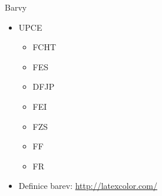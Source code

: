 \documentclass{beamer}							%
\begin{document}
\begin{frame}[fragile, shrink=0]{Barvy}
	\begin{itemize}
		\item \textcolor{upce}{UPCE}
		\begin{itemize}
			\item \textcolor{fcht}{FCHT}
			\item \textcolor{fes}{FES}
			\item \textcolor{dfjp}{DFJP}
			\item \textcolor{fei}{FEI}
			\item \textcolor{fzs}{FZS}
			\item \textcolor{ff}{FF}
			\item \textcolor{fr}{FR}
		\end{itemize}

		\item Definice barev: \url{http://latexcolor.com/}
	\end{itemize}
\end{frame}
\end{document}
